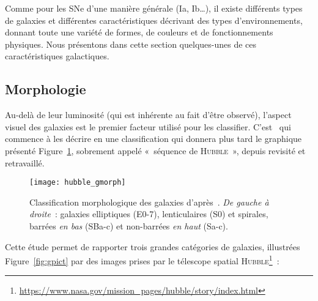 \documentclass[../main/main.tex]{subfiles}
\begin{document}
Comme pour les SNe d'une manière générale (Ia, Ib…), il existe différents types
de galaxies et différentes caractéristiques décrivant des types
d'environnements, donnant toute une variété de formes, de couleurs et de
fonctionnements physiques. Nous présentons dans cette section quelques-unes de
ces caractéristiques galactiques.

\subsection{Morphologie}\label{ssec:morphost}

Au-delà de leur luminosité (qui est inhérente au fait d'être observé), l'aspect
visuel des galaxies est le premier facteur utilisé pour les classifier.
C'est~\cite{hubble1926} qui commence à les décrire en une classification qui
donnera plus tard \citep{hubble1936} le graphique présenté
Figure~\ref{fig:gmorph}, sobrement appelé «~séquence de \textsc{Hubble}~»,
depuis revisité et retravaillé. 

\begin{figure}[ht]
    \centering
    \texttt{[image: hubble\_gmorph]}
    \caption[Classification morphologique des galaxies]{Classification
        morphologique des galaxies d'après~\cite{hubble1936}. \textit{De gauche
        à droite}~: galaxies elliptiques (E0-7), lenticulaires (S0) et spirales,
    barrées \textit{en bas} (SBa-c) et non-barrées \textit{en haut} (Sa-c).}
    \label{fig:gmorph}
\end{figure}

Cette étude permet de rapporter trois grandes catégories de galaxies, illustrées
Figure~\ref{fig:gpict} par des images prises par le télescope spatial
\textsc{Hubble}\footnote{\label{fn:hst1}\href{
    https://www.nasa.gov/mission_pages/hubble/story/index.html}
{https://www.nasa.gov/mission\_pages/hubble/story/index.html}}~:
\end{document}
